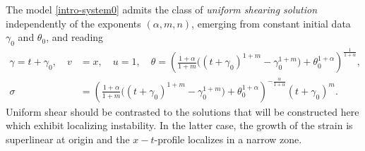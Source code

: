 \documentclass[a4paper,11pt]{article}
\theoremstyle{remark}
\begin{document}
The model \eqref{intro-system0} admits the class of {\it uniform shearing solution} independently of the exponents $(\alpha,m,n)$, emerging from constant initial
data $\gamma_0$ and $\theta_0$, and  reading
\begin{equation} \label{intro:uss}
 \begin{aligned}
 \gamma = t+\gamma_0, \quad v&=x, \quad u=1, \quad \theta = \left( \frac{1+\alpha}{1+m} \big( (t+\gamma_0)^{1+m}-\gamma_0^{1+m}\big) + \theta_0^{1+\alpha}\right)^{\frac{1}{1+\alpha}}, \\
 \sigma&=\left( \frac{1+\alpha}{1+m} \big( (t+\gamma_0)^{1+m}-\gamma_0^{1+m}\big) + \theta_0^{1+\alpha} \right)^{-\frac{\alpha}{1+\alpha}}(t+\gamma_0)^m.
 \end{aligned}
\end{equation}
Uniform shear should be contrasted to the solutions that will be constructed here which exhibit localizing instability.
 In the latter case, the growth of the strain is superlinear at origin and the $x-t$-profile localizes in a narrow zone.%

\end{document}
